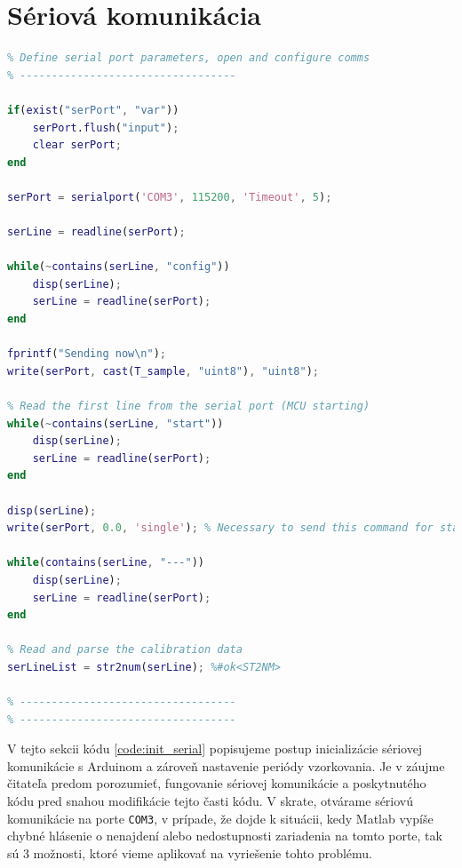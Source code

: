 \documentclass[a4paper, 10pt, ]{article}
\begin{document}
\section{Sériová komunikácia}
\begin{lstlisting}[caption=Inicializácia sériovej komunikácie a konfigurácia., label={code:init_serial}, language=Matlab]
% ----------------------------------
% Define serial port parameters, open and configure comms
% ----------------------------------

if(exist("serPort", "var"))
    serPort.flush("input");
    clear serPort;
end

serPort = serialport('COM3', 115200, 'Timeout', 5);

serLine = readline(serPort);

while(~contains(serLine, "config"))
    disp(serLine);
    serLine = readline(serPort);
end

fprintf("Sending now\n");
write(serPort, cast(T_sample, "uint8"), "uint8");

% Read the first line from the serial port (MCU starting)
while(~contains(serLine, "start"))
    disp(serLine);
    serLine = readline(serPort);
end

disp(serLine);
write(serPort, 0.0, 'single'); % Necessary to send this command for stable sampling period

while(contains(serLine, "---"))
    disp(serLine);
    serLine = readline(serPort);
end

% Read and parse the calibration data
serLineList = str2num(serLine); %#ok<ST2NM>

% ----------------------------------
% ----------------------------------
\end{lstlisting}

V tejto sekcii kódu \ref{code:init_serial} popisujeme postup inicializácie sériovej komunikácie s Arduinom a zároveň nastavenie periódy vzorkovania. Je v záujme čitateľa predom porozumieť, fungovanie sériovej komunikácie a poskytnutého kódu pred snahou modifikácie tejto časti kódu.
V skrate, otvárame sériovú komunikácie na porte \texttt{COM3}, v prípade, že dojde k situácii, kedy Matlab vypíše chybné hlásenie o nenajdení alebo nedostupnosti zariadenia na tomto porte, tak sú 3 možnosti, ktoré vieme aplikovať na vyriešenie tohto problému.
\end{document}
